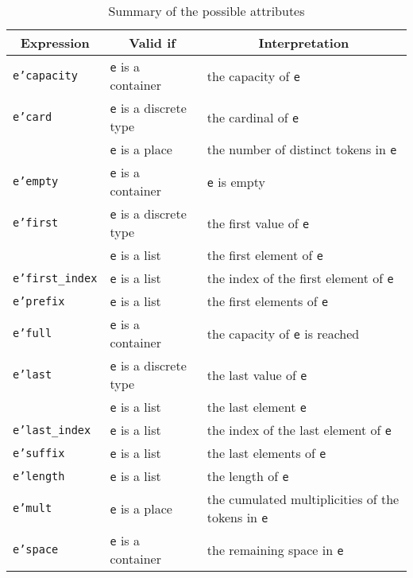 \begin{table}
  \caption{Summary of the possible attributes}
  \label{table_attributes}
  \begin{center}
    \begin{tabular}{|l|l|l|}
      \hline
      \multicolumn{1}{|c|}{Expression} &
      \multicolumn{1}{|c|}{Valid if} &
      \multicolumn{1}{|c|}{Interpretation}\\
      \hline
      \texttt{e'capacity} &
      \texttt{e} is a container &
      the capacity of \texttt{e}\\
      \hline
      \texttt{e'card} &
      \texttt{e} is a discrete type &
      the cardinal of \texttt{e}\\
      &
      \texttt{e} is a place &
      the number of distinct tokens in \texttt{e}\\
      \hline
      \texttt{e'empty} &
      \texttt{e} is a container &
      \texttt{e} is empty\\
      \hline
      \texttt{e'first} &
      \texttt{e} is a discrete type &
      the first value of \texttt{e}\\
      &
      \texttt{e} is a list &
      the first element of \texttt{e}\\
      \hline
      \texttt{e'first\_index} &
      \texttt{e} is a list &
      the index of the first element of \texttt{e}\\
      \hline
      \texttt{e'prefix} &
      \texttt{e} is a list &
      the first elements of \texttt{e}\\
      \hline
      \texttt{e'full} &
      \texttt{e} is a container &
      the capacity of \texttt{e} is reached\\
      \hline
      \texttt{e'last} &
      \texttt{e} is a discrete type &
      the last value of \texttt{e}\\
      &
      \texttt{e} is a list &
      the last element \texttt{e}\\
      \hline
      \texttt{e'last\_index} &
      \texttt{e} is a list &
      the index of the last element of \texttt{e}\\
      \hline
      \texttt{e'suffix} &
      \texttt{e} is a list &
      the last elements of \texttt{e}\\
      \hline
      \texttt{e'length} &
      \texttt{e} is a list &
      the length of \texttt{e}\\
      \hline
      \texttt{e'mult} &
      \texttt{e} is a place &
      the cumulated multiplicities of the tokens in \texttt{e}\\
      \hline
      \texttt{e'space} &
      \texttt{e} is a container &
      the remaining space in \texttt{e}\\
      \hline
    \end{tabular}
  \end{center}
\end{table}

